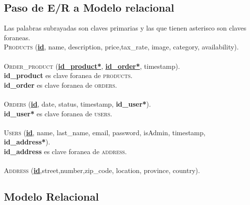 \documentclass{article}
\begin{document}
\subsection{Paso de E/R a Modelo relacional}
\quad Las palabras subrayadas son claves primarias y las que tienen asterisco son claves foraneas.\\
\textsc{Products} (\underline{\textbf{id}}, name, description, price,tax\_rate, image, category, availability).\\\\
\textsc{Order\_product} (\underline{\textbf{id\_product*}}, \underline{\textbf{id\_order*}}, timestamp).\\
\textbf{id\_product} es clave foranea de \textsc{products}.\\
\textbf{id\_order} es clave foranea de \textsc{orders}.\\\\
\textsc{Orders} (\underline{\textbf{id}}, date, status, timestamp, \textbf{id\_user*}).\\
\textbf{id\_user*} es clave foranea de \textsc{users}.\\\\
\textsc{Users} (\underline{\textbf{id}}, name, last\_name, email, password, isAdmin, timestamp, \textbf{id\_address*}).\\
\textbf{id\_address} es clave foranea de \textsc{address}.\\\\
\textsc{Address} (\underline{\textbf{id}},street,number,zip\_code, location, province, country).

\subsection{Modelo Relacional}
\end{document}
